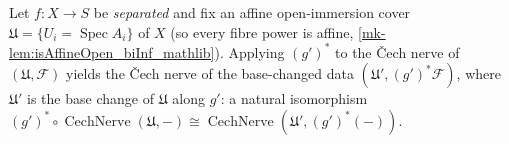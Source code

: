 \begin{lemma}
  \label{mk-lem:twisted_cech_nerve_iso}

  Let \(f : X \to S\) be \emph{separated} and fix an affine open-immersion cover
  \(\mathfrak{U} = \{U_i = \operatorname{Spec} A_i\}\) of \(X\) (so every fibre power is
  affine, \ref{mk-lem:isAffineOpen_biInf_mathlib}). Applying \((g')^*\) to the {\v C}ech
  nerve of \((\mathfrak{U}, \mathcal{F})\) yields the {\v C}ech nerve of the base-changed
  data \((\mathfrak{U}', (g')^*\mathcal{F})\), where \(\mathfrak{U}'\) is the base change of
  \(\mathfrak{U}\) along \(g'\): a natural isomorphism
  \((g')^* \circ \operatorname{CechNerve}(\mathfrak{U}, -) \cong
  \operatorname{CechNerve}(\mathfrak{U}', (g')^*(-))\).
\end{lemma}

